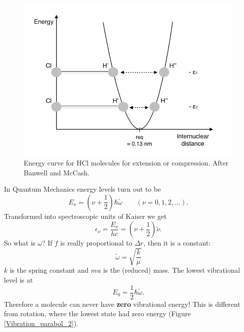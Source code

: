 \begin{figure}[htbp]
\begin{center}
\includegraphics[width=1\textwidth]{figures/Vibration_parabol}
\caption{Energy curve for HCl molecules for extension or compression. After Banwell and McCash.}
\label{Vibration_parabol}
\end{center}
\end{figure}

In Quantum Mechanics energy levels turn out to be 
\begin{equation}
E_\nu = (\nu+\frac{1}{2})\hbar\tilde{\omega} \qquad (\nu = 0, 1, 2, ...).
\end{equation}
Transformed into spectroscopic units of Kaiser we get
\begin{equation}
\epsilon_\nu = \frac{E_\nu}{hc} = (\nu + \frac{1}{2})\tilde{\nu}.
\end{equation}
So what is $\omega$? If $f$ is really proportional to $\Delta r$, then it is a constant:
\begin{equation}
\tilde{\omega} = \sqrt{\frac{k}{\mu}}
\end{equation}
$k$ is the spring constant and $mu$ is the (reduced) mass.
The lowest vibrational level is at
\begin{equation}
E_0 = \frac{1}{2} \hbar \tilde{\omega}.
\end{equation}
Therefore a molecule can never have \textbf{zero} vibrational energy! This is different from rotation, where the lowest state had zero energy (Figure \ref{Vibration_parabol_2}). \par


